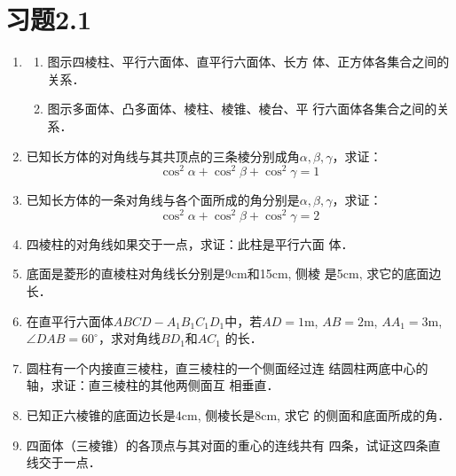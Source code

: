 \section*{习题2.1}

\begin{enumerate}
    \item \begin{enumerate}
        \item 图示四棱柱、平行六面体、直平行六面体、长方
    体、正方体各集合之间的关系．
    \item 图示多面体、凸多面体、棱柱、棱锥、棱台、平
    行六面体各集合之间的关系．
    \end{enumerate}
   
    \item 已知长方体的对角线与其共顶点的三条棱分别成角$\alpha,\beta,\gamma$，求证：
    \[\cos^2\alpha+\cos^2\beta+\cos^2\gamma=1\]
    \item 已知长方体的一条对角线与各个面所成的角分别是$\alpha,\beta,\gamma$，求证：\[\cos^2\alpha+\cos^2\beta+\cos^2\gamma=2\]
    \item 四棱柱的对角线如果交于一点，求证：此柱是平行六面
    体．
    \item 底面是菱形的直棱柱对角线长分别是9cm和15cm, 侧棱
    是5cm, 求它的底面边长．
    \item 在直平行六面体$ABCD-A_1B_1C_1D_1$中，若$AD=1$m,
    $AB=2$m, $AA_1=3$m, $\angle DAB=60^{\circ}$，求对角线$BD_1$和$AC_1$
    的长．
    \item 圆柱有一个内接直三棱柱，直三棱柱的一个侧面经过连
    结圆柱两底中心的轴，求证：直三棱柱的其他两侧面互
    相垂直．
    \item 已知正六棱锥的底面边长是4cm, 侧棱长是8cm, 求它
    的侧面和底面所成的角．
    \item 四面体（三棱锥）的各顶点与其对面的重心的连线共有
    四条，试证这四条直线交于一点．


\end{enumerate}
